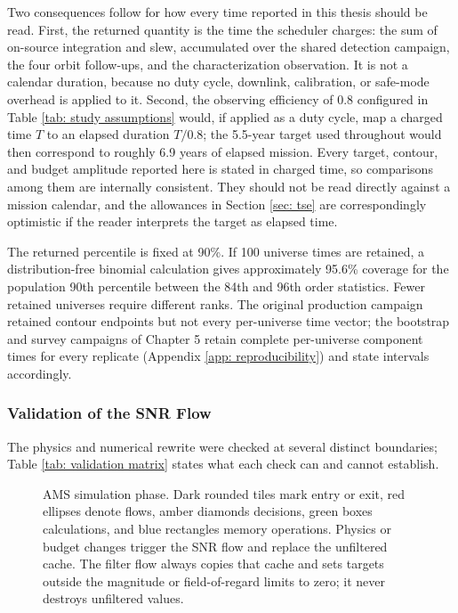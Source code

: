 \documentclass[12pt,a4paper]{article}
\numberwithin{equation}{section}
\numberwithin{figure}{section}
\numberwithin{table}{section}
\begin{document}
Two consequences follow for how every time reported in this thesis should be read. First, the returned quantity is the time the scheduler charges: the sum of on-source integration and slew, accumulated over the shared detection campaign, the four orbit follow-ups, and the characterization observation. It is not a calendar duration, because no duty cycle, downlink, calibration, or safe-mode overhead is applied to it. Second, the observing efficiency of 0.8 configured in Table \ref{tab: study assumptions} would, if applied as a duty cycle, map a charged time $T$ to an elapsed duration $T/0.8$; the 5.5-year target used throughout would then correspond to roughly 6.9 years of elapsed mission. Every target, contour, and budget amplitude reported here is stated in charged time, so comparisons among them are internally consistent. They should not be read directly against a mission calendar, and the allowances in Section \ref{sec: tse} are correspondingly optimistic if the reader interprets the target as elapsed time.

The returned percentile is fixed at 90\%. If 100 universe times are retained, a distribution-free binomial calculation gives approximately 95.6\% coverage for the population 90th percentile between the 84th and 96th order statistics. Fewer retained universes require different ranks. The original production campaign retained contour endpoints but not every per-universe time vector; the bootstrap and survey campaigns of Chapter 5 retain complete per-universe component times for every replicate (Appendix \ref{app: reproducibility}) and state intervals accordingly.

\subsubsection{Validation of the SNR Flow}
The physics and numerical rewrite were checked at several distinct boundaries; Table \ref{tab: validation matrix} states what each check can and cannot establish.

\begin{landscape}
\begin{figure}[p]
    \centering
    
    \caption{AMS simulation phase. Dark rounded tiles mark entry or exit, red ellipses denote flows, amber diamonds decisions, green boxes calculations, and blue rectangles memory operations. Physics or budget changes trigger the SNR flow and replace the unfiltered cache. The filter flow always copies that cache and sets targets outside the magnitude or field-of-regard limits to zero; it never destroys unfiltered values.}
    \label{fig: simphase flowchart}
\end{figure}
\end{landscape}
\end{document}
